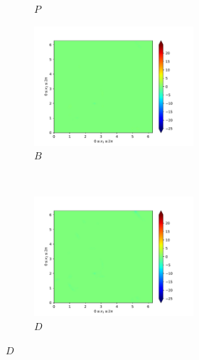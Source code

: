 \begin{figure}[H]
\begin{subfigure}{0.45\textwidth}
        \caption{$P$}
    \end{subfigure}
    \newline
    \begin{subfigure}{0.45\textwidth}
        \includegraphics[height=1.75in]{media/run-cds-65/B-ke-1320}
        \caption{$B$}
    \end{subfigure}
    ~
    \begin{subfigure}{0.45\textwidth}
        \includegraphics[height=1.75in]{media/run-cds-65/D-ke-1320}
        \caption{$D$}
    \end{subfigure}
\end{figure}

\newpage

